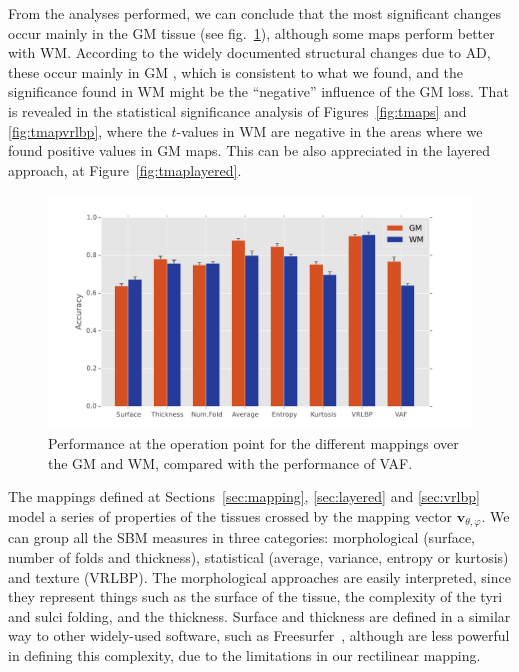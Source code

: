 From the analyses performed, we can conclude that the most significant changes occur mainly in the \ac{GM} tissue (see fig.~\ref{fig:performance}), although some maps perform better with \ac{WM}. According to the widely documented structural changes due to \ac{AD}, these occur mainly in \ac{GM} \cite{Misra2009,Baron2001,Pievani2013,Stoeckel04,han2006reliability,Fischl2004}, which is consistent to what we found, and the significance found in \ac{WM} might be the ``negative'' influence of the \ac{GM} loss. That is revealed in the statistical significance analysis of Figures~\ref{fig:tmaps} and \ref{fig:tmapvrlbp}, where the $t$-values in \ac{WM} are negative in the areas where we found positive values in \ac{GM} maps. This can be also appreciated in the layered approach, at Figure~\ref{fig:tmaplayered}. 

\begin{figure}[htp]
	\centering
	\includegraphics[width=0.8\columnwidth]{Graphics/ch6/12-performance}
	\caption{Performance at the operation point for the different mappings over the \acs{GM} and \acs{WM}, compared with the performance of \acs{VAF}.}
	\label{fig:performance}
\end{figure}

The mappings defined at Sections~\ref{sec:mapping}, \ref{sec:layered} and \ref{sec:vrlbp} model a series of properties of the tissues crossed by the mapping vector $\mathbf{v}_{\theta,\varphi}$. We can group all the \ac{SBM} measures in three categories: morphological (surface, number of folds and thickness), statistical (average, variance, entropy or kurtosis) and texture (\ac{VRLBP}). The morphological approaches are easily interpreted, since they represent things such as the surface of the tissue, the complexity of the tyri and sulci folding, and the thickness. Surface and thickness are defined in a similar way to other widely-used software, such as Freesurfer~\cite{Dale1999,Fischl2004}, although are less powerful in defining this complexity, due to the limitations in our rectilinear mapping. 

